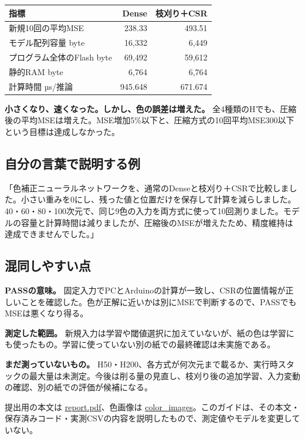 \documentclass[
  11pt,
  a4paper,
]{article}
\begin{document}
\begin{longtable}[]{@{}lrr@{}}
\toprule\noalign{}
指標 & Dense & 枝刈り＋CSR \\
\midrule\noalign{}
\endhead
\bottomrule\noalign{}
\endlastfoot
新規10回の平均MSE & 238.33 & 493.51 \\
モデル配列容量 byte & 16,332 & 6,449 \\
プログラム全体のFlash byte & 69,492 & 59,612 \\
静的RAM byte & 6,764 & 6,764 \\
計算時間 µs/推論 & 945.648 & 671.674 \\
\end{longtable}

\textbf{小さくなり、速くなった。しかし、色の誤差は増えた。}
全4種類のHでも、圧縮後の平均MSEは増えた。MSE増加5\%以下と、圧縮方式の10回平均MSE300以下という目標は達成しなかった。

\subsection{自分の言葉で説明する例}\label{ux81eaux5206ux306eux8a00ux8449ux3067ux8aacux660eux3059ux308bux4f8b}

「色補正ニューラルネットワークを、通常のDenseと枝刈り＋CSRで比較しました。小さい重みを0にし、残った値と位置だけを保存して計算を減らしました。40・60・80・100次元で、同じ9色の入力を両方式に使って10回測りました。モデルの容量と計算時間は減りましたが、圧縮後のMSEが増えたため、精度維持は達成できませんでした。」

\subsection{混同しやすい点}\label{ux6df7ux540cux3057ux3084ux3059ux3044ux70b9}

\textbf{PASSの意味。}
固定入力でPCとArduinoの計算が一致し、CSRの位置情報が正しいことを確認した。色が正解に近いかは別にMSEで判断するので、PASSでもMSEは悪くなり得る。

\textbf{測定した範囲。}
新規入力は学習や閾値選択に加えていないが、紙の色は学習にも使ったもの。学習に使っていない別の紙での最終確認は未実施である。

\textbf{まだ測っていないもの。}
H50・H200、各方式が何次元まで載るか、実行時スタックの最大量は未測定。今後は削る量の見直し、枝刈り後の追加学習、入力変動の確認、別の紙での評価が候補になる。

提出用の本文は \href{../report.pdf}{report.pdf}、色画像は
\href{../color_images/README.md}{color\_images}。このガイドは、その本文・保存済みコード・実測CSVの内容を説明したもので、測定値やモデルを変更していない。
\end{document}
